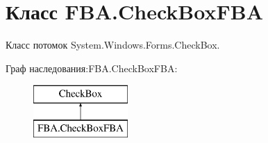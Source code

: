 \hypertarget{class_f_b_a_1_1_check_box_f_b_a}{}\section{Класс F\+B\+A.\+Check\+Box\+F\+BA}
\label{class_f_b_a_1_1_check_box_f_b_a}


Класс потомок System.\+Windows.\+Forms.\+Check\+Box.  


Граф наследования\+:F\+B\+A.\+Check\+Box\+F\+BA\+:\begin{figure}[H]
\begin{center}
\leavevmode
\includegraphics[height=2.000000cm]{class_f_b_a_1_1_check_box_f_b_a}
\end{center}
\end{figure}
